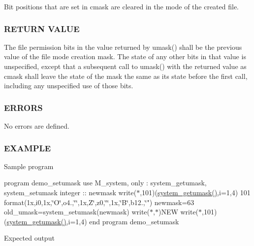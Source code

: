 Bit positions that are set in cmask are cleared in the mode of the created file.

\subsubsection*{R\+E\+T\+U\+RN V\+A\+L\+UE}

The file permission bits in the value returned by umask() shall be the previous value of the file mode creation mask. The state of any other bits in that value is unspecified, except that a subsequent call to umask() with the returned value as cmask shall leave the state of the mask the same as its state before the first call, including any unspecified use of those bits.

\subsubsection*{E\+R\+R\+O\+RS}

No errors are defined.

\subsubsection*{E\+X\+A\+M\+P\+LE}

Sample program

program demo\+\_\+setumask use M\+\_\+system, only \+: system\+\_\+getumask, system\+\_\+setumask integer \+:\+: newmask write($\ast$,101)(\hyperlink{namespacem__system_aa9ca951be39d2ea738d627cf42c00ddd}{system\+\_\+getumask()},i=1,4) 101 format(1x,i0,1x,\char`\"{}\+O\textquotesingle{}\char`\"{},o4.,\char`\"{}\textquotesingle{}\char`\"{},1x,\textquotesingle{}Z\char`\"{}\textquotesingle{},z0,\char`\"{}\textquotesingle{}\char`\"{},1x,\char`\"{}B\textquotesingle{}\char`\"{},b12.,\char`\"{}\textquotesingle{}") newmask=63 old\+\_\+umask=system\+\_\+setumask(newmask) write($\ast$,$\ast$)\textquotesingle{}N\+EW\textquotesingle{} write($\ast$,101)(\hyperlink{namespacem__system_aa9ca951be39d2ea738d627cf42c00ddd}{system\+\_\+getumask()},i=1,4) end program demo\+\_\+setumask

Expected output

